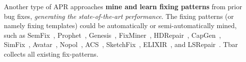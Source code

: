 %
Another type of APR approaches {\bf mine and learn fixing patterns} from prior bug
fixes, \textit{generating the state-of-the-art performance}. The fixing patterns (or namely fixing templates) could be automatically
or semi-automatically mined, such as SemFix~\cite{nguyen2013semfix}, Prophet~\cite{long2016automatic}, Genesis~\cite{long2017automatic}, FixMiner~\cite{koyuncu2018fixminer}, HDRepair~\cite{le2016history}, CapGen~\cite{wen2018context}, SimFix~\cite{jiang2018shaping}, Avatar~\cite{liu2019avatar}, Nopol~\cite{Nopol}, ACS~\cite{ACS}, SketchFix~\cite{SketchFix}, ELIXIR~\cite{saha2017elixir}, and LSRepair~\cite{LSRepair}. Tbar~\cite{tbar-issta19} collects all existing fix-patterns.
